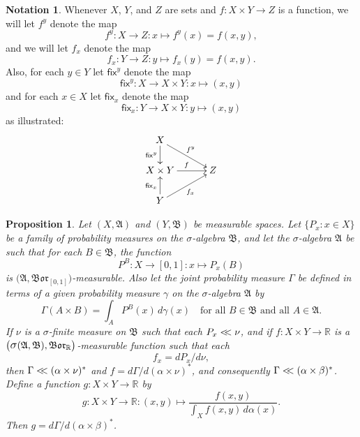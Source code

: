 \documentclass[
twoside=true,
paper=letter,
fontsize=9pt,
pagesize=auto,
leqno,
openany,
headsepline,
overfullrule,
]{scrbook}
\theoremstyle{plain}
\theoremstyle{plain}
\newtheorem{prop}[thm]{Proposition}
\theoremstyle{definition}
\newtheorem{notn}[thm]{Notation}
\theoremstyle{bfnoteitalic}
\theoremstyle{bfnoteroman}
\newcommand{\sigalg}[1]{\mathfrak{#1}}
\newcommand{\sfop}[1]{\mathsf{#1}}
\newcommand{\borel}{\mathfrak{Bor}}
\newcommand{\sagb}{\mathop{\hbox{\large{$\sigma$}}}\nolimits}
\newcommand{\textsigma}{\hbox{\large{$\sigma$}}\kern-1pt}
\newcommand{\R}{\mathbb{R}}
\newcommand{\sigmaalgebra}{\sigalg{A}}
\newcommand{\sigmaalgebraii}{\sigalg{B}}
\newcommand{\productsig}[2]{\sagb(#1,#2)}
\newcommand{\funcf}{f}
\newcommand{\funcg}{g}
\newcommand{\function}{f}
\newcommand{\measurespace}{X}
\newcommand{\measurespaceii}{Y}
\newcommand{\measurespaceiii}{Z}
\newcommand{\mspaceelt}{x}
\newcommand{\mspaceeltii}{y}
\newcommand{\abscont}{\mathrel{< \kern-3.5pt <}}
\newcommand{\measnu}{\nu}
\newcommand{\fixinthefirst}[1]{\sfop{fix}_{#1}}
\newcommand{\fixinthesecond}[1]{\sfop{fix}^{#1}}
\newcommand{\pspace}{\measurespace}%
\newcommand{\sspace}{\measurespaceii}%
\newcommand{\pspaceset}{A}
\newcommand{\sspaceset}{B}
\newcommand{\pspaceelt}{x}
\newcommand{\sspaceelt}{y}
\newcommand{\sspacesig}{\sigalg{B}}
\newcommand{\pspacesig}{\sigalg{A}}
\newcommand{\joint}{\Gamma}%
\newcommand{\measonprod}{\Gamma}%
\newcommand{\marginalone}{\alpha}%
\newcommand{\marginaltwo}{\beta}%
\newcommand{\prior}{\marginalone}
\newcommand{\predictive}{\marginaltwo}
\newcommand{\wouldbeprior}{\gamma}
\begin{document}
\begin{notn}
Whenever $\measurespace$, $\measurespaceii$, and 
$\measurespaceiii$ are sets and 
$\function
:\measurespace\times\measurespaceii\to\measurespaceiii$ is a function, we will let 
$\function^\mspaceeltii$ denote the map
\[
\function^\mspaceeltii
:\measurespace\to\measurespaceiii: 
\mspaceelt \mapsto \function^\mspaceeltii(\mspaceelt) 
= \function(\mspaceelt,\mspaceeltii),
\]
and we will let $\function_\mspaceelt$ denote the map
\[
\function_\mspaceelt
:\measurespaceii\to\measurespaceiii: 
\mspaceeltii \mapsto \function_\mspaceelt(\mspaceeltii) 
= \function(\mspaceelt,\mspaceeltii).
\]
Also, for each $\mspaceeltii\in\measurespaceii$ let
$\fixinthesecond{\mspaceeltii}$ denote the map
\[
\fixinthesecond{\mspaceeltii}
:\measurespace\to\measurespace\times\measurespaceii
:\mspaceelt\mapsto (\mspaceelt,\mspaceeltii)
\]
and for each $\mspaceelt\in\measurespace$ let
$\fixinthefirst{\mspaceelt}$ denote the map
\[
\fixinthefirst{\mspaceelt}
:\measurespaceii\to\measurespace\times\measurespaceii
:\mspaceeltii\mapsto (\mspaceelt,\mspaceeltii)
\]
as illustrated:
\[
\xymatrix@R=18pt@C=30pt{ 
\measurespace \ar[d]_-{\fixinthesecond{\mspaceeltii}}
\ar[dr]^{\function^\mspaceeltii}
\\
\measurespace\times \measurespaceii
\ar[r]^{\function} & \measurespaceiii
\\
\measurespaceii
\ar[ur]_{\function_\mspaceelt}
\ar[u]^{\fixinthefirst{\mspaceelt}} & \\
}
\]
\end{notn}

\begin{prop}
Let
$(\measurespace, \sigmaalgebra)$
and
$(\measurespaceii, \sigmaalgebraii)$
be measurable spaces.
Let
$\{ P_\pspaceelt :\pspaceelt\in\pspace \}$
be a family of probability measures on the \textsigma-algebra
$\sspacesig$,
and let the \textsigma\hyp{}algebra $\pspacesig$ be such that for each
$\sspaceset\in\sspacesig$, the function
\[
P^\sspaceset
:\pspace \to [0,1]
:\pspaceelt \mapsto P_\pspaceelt(\sspaceset)
\]
is $\bigl(\pspacesig,\borel_{[0,1]}\bigr)$\hyp{}measurable.
Also let the joint probability measure $\joint$  be defined in terms of
a given probability measure $\wouldbeprior$ on the \textsigma-algebra
$\pspacesig$ by
\[
\measonprod(\pspaceset\times\sspaceset)
=
\int_\pspaceset P^\sspaceset(\pspaceelt)
\, d\wouldbeprior(\pspaceelt)
\quad
\text{for all $\sspaceset\in\sspacesig$ and all $\pspaceset \in \pspacesig$.}
\]
If $\measnu$ is a \textsigma-finite measure on $\sspacesig$
such that each
$P_\pspaceelt\abscont \measnu$, and if
$\funcf : \pspace\times\sspace\to\R$ is a
$\bigl(\productsig{\pspacesig}{\sspacesig},\borel_\R\bigr)$\hyp{}measurable function
such that each
\[
\function_\pspaceelt
=
d P_\pspaceelt/d\measnu,
\]
then
$\joint \abscont (\prior \times\measnu)^*$
and
$\funcf
=
d\measonprod/d(\prior \times\measnu)^*$,
and consequently
$\measonprod\abscont (\prior\times\predictive)^*$.
Define a function
$\funcg: \pspace\times\sspace\to\R$ by
\[
\funcg
: \pspace\times\sspace \to \R
: (\pspaceelt,\sspaceelt) \mapsto
\frac
{\funcf(\pspaceelt,\sspaceelt)}
{\int_\pspace \function(\pspaceelt,\sspaceelt)\,
d\prior(\pspaceelt)}.
\]
Then
$\funcg
=
d\measonprod/d(\prior\times\predictive)^*$.
\end{prop}
\end{document}
